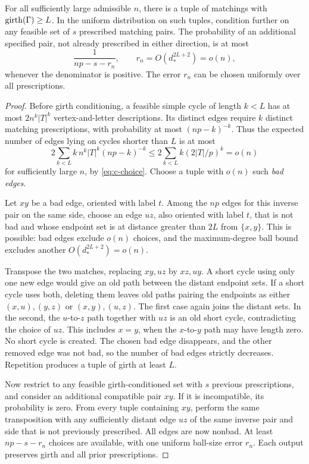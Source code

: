 \begin{lemma}\label{lem:prescriptions}
For all sufficiently large admissible \(n\), there is a tuple of matchings with \(\operatorname{girth}(\Gamma)\ge L\).
In the uniform distribution on such tuples, condition further on any feasible set of \(s\) prescribed matching pairs. The probability of an additional specified pair, not already prescribed in either direction, is at most
\begin{equation}\label{eq:prescription-bound}
 \frac{1}{np-s-r_n},
 \qquad r_n=O(d_*^{2L+2})=o(n),
\end{equation}
whenever the denominator is positive.
The error \(r_n\) can be chosen uniformly over all prescriptions.
\end{lemma}
\begin{proof}
Before girth conditioning, a feasible simple cycle of length \(k<L\) has at most \(2n^k|T|^k\) vertex-and-letter descriptions. Its distinct edges require \(k\) distinct matching prescriptions, with probability at most \((np-k)^{-k}\). Thus the expected number of edges lying on cycles shorter than \(L\) is at most
\[
2\sum_{k<L}k\,n^k|T|^k(np-k)^{-k}
 \le2\sum_{k<L}k(2|T|/p)^k=o(n)
\]
for sufficiently large \(n\), by \eqref{eq:c-choice}. Choose a tuple with \(o(n)\) such \emph{bad edges}.

Let \(xy\) be a bad edge, oriented with label \(t\). Among the \(np\) edges for this inverse pair on the same side, choose an edge \(uz\), also oriented with label \(t\), that is not bad and whose endpoint set is at distance greater than \(2L\) from \(\{x,y\}\). This is possible: bad edges exclude \(o(n)\) choices, and the maximum-degree ball bound excludes another \(O(d_*^{2L+2})=o(n)\).

Transpose the two matches, replacing \(xy,uz\) by \(xz,uy\). A short cycle using only one new edge would give an old path between the distant endpoint sets. If a short cycle uses both, deleting them leaves old paths pairing the endpoints as either \((x,u),(y,z)\) or \((x,y),(u,z)\). The first case again joins the distant sets. In the second, the \(u\)-to-\(z\) path together with \(uz\) is an old short cycle, contradicting the choice of \(uz\). This includes \(x=y\), when the \(x\)-to-\(y\) path may have length zero. No short cycle is created. The chosen bad edge disappears, and the other removed edge was not bad, so the number of bad edges strictly decreases. Repetition produces a tuple of girth at least \(L\).

Now restrict to any feasible girth-conditioned set with \(s\) previous prescriptions, and consider an additional compatible pair \(xy\). If it is incompatible, its probability is zero. From every tuple containing \(xy\), perform the same transposition with any sufficiently distant edge \(uz\) of the same inverse pair and side that is not previously prescribed. All edges are now nonbad. At least \(np-s-r_n\) choices are available, with one uniform ball-size error \(r_n\). Each output preserves girth and all prior prescriptions.


\end{proof}
